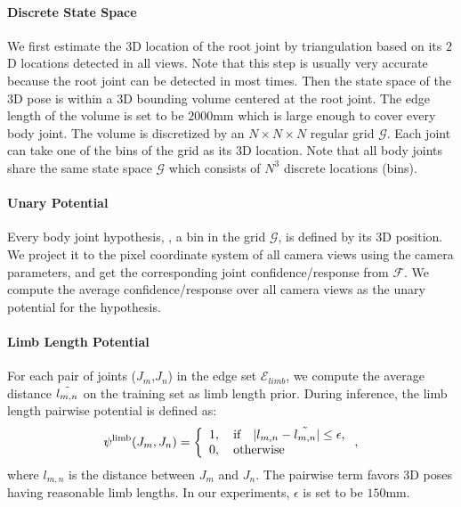 \documentclass[10pt,twocolumn,letterpaper]{article}
\begin{document}
\paragraph{Discrete State Space} We first estimate the $3$D location of the root joint by triangulation based on its $2$D locations detected in all views. Note that this step is usually very accurate because the root joint can be detected in most times. Then the state space of the $3$D pose is within a $3$D bounding volume centered at the root joint. The edge length of the volume is set to be $2000$mm which is large enough to cover every body joint. The volume is discretized by an $N \times N \times N$ regular grid $\mathcal{G}$. Each joint can take one of the bins of the grid as its $3$D location. Note that all body joints share the same state space $\mathcal{G}$ which consists of $N^3$ discrete locations (bins).



\paragraph{Unary Potential} Every body joint hypothesis, \ie, a bin in the grid $\mathcal{G}$, is defined by its $3$D position. We project it to the pixel coordinate system of all camera views using the camera parameters, and get the corresponding joint confidence/response from $\mathcal{F}$. We compute the average confidence/response over all camera views as the unary potential for the hypothesis.




\paragraph{Limb Length Potential}
For each pair of joints (${J}_m$,${J}_n$) in the edge set $\mathcal{E}_{limb}$, we compute the average distance $\Tilde{l_{m,n}}$ on the training set as limb length prior. During inference, the limb length pairwise potential is defined as:
\begin{equation}
    \psi^{\text{limb}}({J}_m, {J}_n) = 
    \left\{
                \begin{array}{ll}
                  1, \quad \text{if} \quad |l_{m,n} - \Tilde{l_{m,n}}| \leq\epsilon,\\
                  0, \quad \text{otherwise}
                \end{array}
              \right.,
\end{equation}
where $l_{m,n}$ is the distance between ${J}_m$ and ${J}_n$.
The pairwise term favors $3$D poses having reasonable limb lengths. In our experiments, $\epsilon$ is set to be $150$mm.
\end{document}

